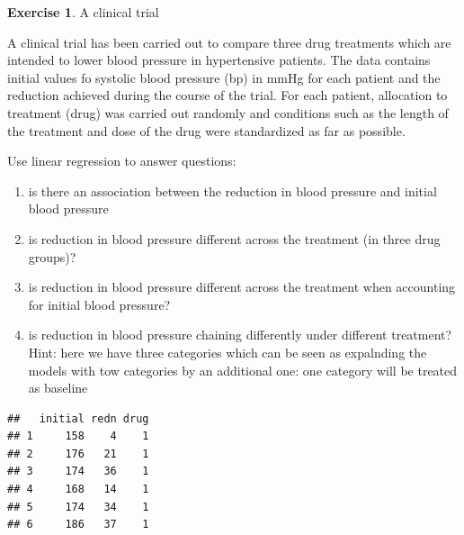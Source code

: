 \documentclass[
]{book}
\newenvironment{Shaded}{\begin{snugshade}}{\end{snugshade}}
\newcommand{\KeywordTok}[1]{\textcolor[rgb]{0.13,0.29,0.53}{\textbf{#1}}}
\newcommand{\NormalTok}[1]{#1}
\newcommand{\OperatorTok}[1]{\textcolor[rgb]{0.81,0.36,0.00}{\textbf{#1}}}
\newcommand{\StringTok}[1]{\textcolor[rgb]{0.31,0.60,0.02}{#1}}
\providecommand{\tightlist}{%
  \setlength{\itemsep}{0pt}\setlength{\parskip}{0pt}}
\theoremstyle{definition}
\theoremstyle{definition}
\theoremstyle{definition}
\newtheorem{exercise}{Exercise}[chapter]
\theoremstyle{remark}
\begin{document}
\begin{exercise}
\protect\hypertarget{exr:lm-blooddrug}{}{\label{exr:lm-blooddrug} }A clinical trial

A clinical trial has been carried out to compare three drug treatments which are intended to lower blood pressure in hypertensive patients. The data contains initial values fo systolic blood pressure (bp) in mmHg for each patient and the reduction achieved during the course of the trial. For each patient, allocation to treatment (drug) was carried out randomly and conditions such as the length of the treatment and dose of the drug were standardized as far as possible.

Use linear regression to answer questions:

\begin{enumerate}
\def\labelenumi{\alph{enumi})}
\tightlist
\item
  is there an association between the reduction in blood pressure and initial blood pressure
\item
  is reduction in blood pressure different across the treatment (in three drug groups)?
\item
  is reduction in blood pressure different across the treatment when accounting for initial blood pressure?
\item
  is reduction in blood pressure chaining differently under different treatment?
  Hint: here we have three categories which can be seen as expalnding the models with tow categories by an additional one: one category will be treated as baseline
\end{enumerate}
\end{exercise}

\begin{Shaded}
\end{Shaded}

\begin{verbatim}
##   initial redn drug
## 1     158    4    1
## 2     176   21    1
## 3     174   36    1
## 4     168   14    1
## 5     174   34    1
## 6     186   37    1
\end{verbatim}
\end{document}
